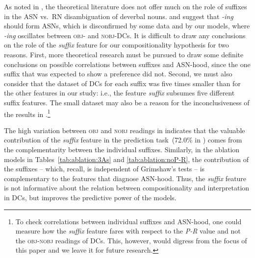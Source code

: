 \documentclass[output=paper]{langsci/langscibook}
\begin{document}
 {As noted in , the theoretical literature does not offer much on the role of suffixes in the ASN vs.\ RN disambiguation of deverbal nouns. \cite{grimshaw:90} and \cite{borer:13} suggest that \textit{-ing} should form ASNs, which is disconfirmed by some data and by our models, where \textit{-ing} oscillates between \textsc{obj}- and \textsc{nobj}-DCs. It is difficult to draw any conclusions on the role of the \textit{suffix} feature for our compositionality hypothesis for two reasons. First, more theoretical research must be pursued to draw some definite conclusions on possible correlations between suffixes and ASN-hood, since the one suffix that was expected to show a preference did not. Second, we must also consider that the dataset of DCs for each suffix was five times smaller than for the other features in our study: i.e., the feature \textit{suffix} subsumes five different suffix features. The small dataset may also be a reason for the inconclusiveness of the results in .}\footnote{ {To check correlations between individual suffixes and ASN-hood, one could measure how the \textit{suffix} feature fares with respect to the \textit{P-R} value and not the \textsc{obj}-\textsc{nobj} readings of DCs. This, however, would digress from the focus of this paper and we leave it for future research.}}


The high variation between \textsc{obj} and \textsc{nobj} readings  in   indicates that the valuable contribution of the \textit{suffix} feature in the prediction task~(72.0\% in ) comes from the complementarity between the individual suffixes. Similarly, in the ablation models in Tables~\ref{tab:ablation:3As} and \ref{tab:ablation:noP-R}, the contribution of the suffixes -- which, recall, is independent of Grimshaw's tests -- is complementary to the features that diagnose ASN-hood. Thus, the \textit{suffix} feature is not informative about the relation between compositionality and interpretation in DCs, but improves the predictive power of the models.
\end{document}

